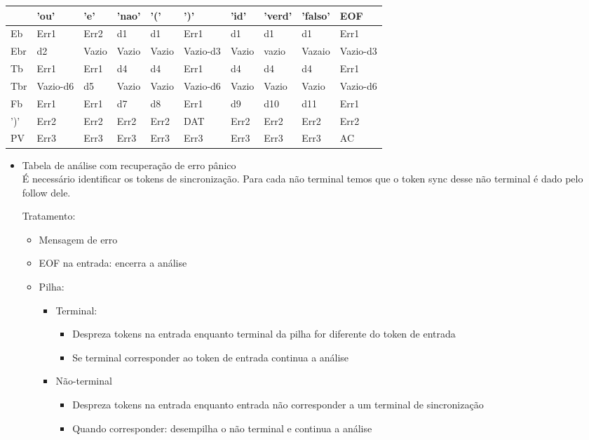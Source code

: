 \documentclass[11pt]{article}
\begin{document}
\begin{center}
\begin{tabular}{l|lllllllll|}
\hline
 & 'ou' & 'e' & 'nao' & '(' & ')' & 'id' & 'verd' & 'falso' & EOF\\
\hline
\hline
Eb & Err1 & Err2 & d1 & d1 & Err1 & d1 & d1 & d1 & Err1\\
\hline
Ebr & d2 & Vazio & Vazio & Vazio & Vazio-d3 & Vazio & vazio & Vazaio & Vazio-d3\\
\hline
Tb & Err1 & Err1 & d4 & d4 & Err1 & d4 & d4 & d4 & Err1\\
\hline
Tbr & Vazio-d6 & d5 & Vazio & Vazio & Vazio-d6 & Vazio & Vazio & Vazio & Vazio-d6\\
\hline
Fb & Err1 & Err1 & d7 & d8 & Err1 & d9 & d10 & d11 & Err1\\
\hline
')' & Err2 & Err2 & Err2 & Err2 & DAT & Err2 & Err2 & Err2 & Err2\\
\hline
PV & Err3 & Err3 & Err3 & Err3 & Err3 & Err3 & Err3 & Err3 & AC\\
\hline
\end{tabular}
\end{center}


\begin{itemize}
\item Tabela de análise com recuperação de erro pânico\\
É necessário identificar os tokens de sincronização. Para cada
não terminal temos que o token sync desse não terminal é dado
pelo follow dele.

Tratamento:
\begin{itemize}
\item Mensagem de erro
\item EOF na entrada: encerra a análise
\item Pilha:
\begin{itemize}
\item Terminal:
\begin{itemize}
\item Despreza tokens na entrada enquanto terminal da pilha
for diferente do token de entrada
\item Se terminal corresponder ao token de entrada continua a
análise
\end{itemize}
\item Não-terminal
\begin{itemize}
\item Despreza tokens na entrada enquanto entrada não
corresponder a um terminal de sincronização
\item Quando corresponder: desempilha o não terminal e continua
a análise
\end{itemize}
\end{itemize}
\end{itemize}
\end{itemize}
\end{document}
